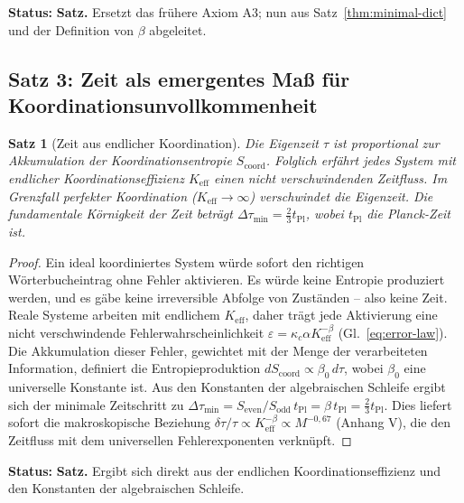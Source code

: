 \documentclass[12pt,a4paper]{article}
\newtheorem{theorem}{Satz}[section]
\begin{document}
	\textbf{Status:} \textbf{Satz.} Ersetzt das frühere Axiom A3; nun aus Satz~\ref{thm:minimal-dict} und der Definition von \(\beta\) abgeleitet.
	
	\subsection{Satz 3: Zeit als emergentes Maß für Koordinationsunvollkommenheit}
	
	\begin{theorem}[Zeit aus endlicher Koordination]
		\label{thm:time}
		Die Eigenzeit \(\tau\) ist proportional zur Akkumulation der Koordinationsentropie \(S_{\mathrm{coord}}\). Folglich erfährt jedes System mit endlicher Koordinationseffizienz \(K_{\mathrm{eff}}\) einen nicht verschwindenden Zeitfluss. Im Grenzfall perfekter Koordination (\(K_{\mathrm{eff}} \to \infty\)) verschwindet die Eigenzeit. Die fundamentale Körnigkeit der Zeit beträgt \(\Delta \tau_{\min} = \frac{2}{3} t_{\mathrm{Pl}}\), wobei \(t_{\mathrm{Pl}}\) die Planck-Zeit ist.
	\end{theorem}
	
	\begin{proof}
		Ein ideal koordiniertes System würde sofort den richtigen Wörterbucheintrag ohne Fehler aktivieren. Es würde keine Entropie produziert werden, und es gäbe keine irreversible Abfolge von Zuständen – also keine Zeit. Reale Systeme arbeiten mit endlichem \(K_{\mathrm{eff}}\), daher trägt jede Aktivierung eine nicht verschwindende Fehlerwahrscheinlichkeit \(\varepsilon = \kappa_c \alpha K_{\mathrm{eff}}^{-\beta}\) (Gl.~\ref{eq:error-law}). Die Akkumulation dieser Fehler, gewichtet mit der Menge der verarbeiteten Information, definiert die Entropieproduktion \(dS_{\mathrm{coord}} \propto \beta_0 \, d\tau\), wobei \(\beta_0\) eine universelle Konstante ist. Aus den Konstanten der algebraischen Schleife ergibt sich der minimale Zeitschritt zu \(\Delta \tau_{\min} = S_{\mathrm{even}}/S_{\mathrm{odd}} \, t_{\mathrm{Pl}} = \beta \, t_{\mathrm{Pl}} = \frac{2}{3} t_{\mathrm{Pl}}\). Dies liefert sofort die makroskopische Beziehung \(\delta\tau/\tau \propto K_{\mathrm{eff}}^{-\beta} \propto M^{-0,67}\) (Anhang V), die den Zeitfluss mit dem universellen Fehlerexponenten verknüpft.
	\end{proof}
	
	\textbf{Status:} \textbf{Satz.} Ergibt sich direkt aus der endlichen Koordinationseffizienz und den Konstanten der algebraischen Schleife.
	
\end{document}
